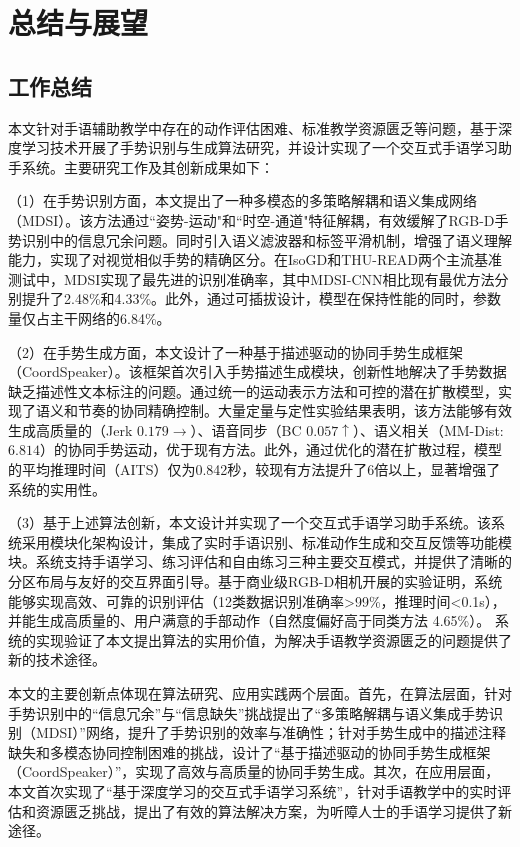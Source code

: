
\chapter{总结与展望}
\label{sec:summary}

\section{工作总结}
本文针对手语辅助教学中存在的动作评估困难、标准教学资源匮乏等问题，基于深度学习技术开展了手势识别与生成算法研究，并设计实现了一个交互式手语学习助手系统。主要研究工作及其创新成果如下：

（1）在手势识别方面，本文提出了一种多模态的多策略解耦和语义集成网络（MDSI）。该方法通过``姿势-运动"和``时空-通道"特征解耦，有效缓解了RGB-D手势识别中的信息冗余问题。同时引入语义滤波器和标签平滑机制，增强了语义理解能力，实现了对视觉相似手势的精确区分。在IsoGD和THU-READ两个主流基准测试中，MDSI实现了最先进的识别准确率，其中MDSI-CNN相比现有最优方法分别提升了2.48\%和4.33\%。此外，通过可插拔设计，模型在保持性能的同时，参数量仅占主干网络的6.84\%。

（2）在手势生成方面，本文设计了一种基于描述驱动的协同手势生成框架（CoordSpeaker）。该框架首次引入手势描述生成模块，创新性地解决了手势数据缺乏描述性文本标注的问题。通过统一的运动表示方法和可控的潜在扩散模型，实现了语义和节奏的协同精确控制。大量定量与定性实验结果表明，该方法能够有效生成高质量的（Jerk $0.179\rightarrow$）、语音同步（BC $0.057\uparrow$）、语义相关（MM-Dist: $6.814$）的协同手势运动，优于现有方法。此外，通过优化的潜在扩散过程，模型的平均推理时间（AITS）仅为0.842秒，较现有方法提升了6倍以上，显著增强了系统的实用性。

（3）基于上述算法创新，本文设计并实现了一个交互式手语学习助手系统。该系统采用模块化架构设计，集成了实时手语识别、标准动作生成和交互反馈等功能模块。系统支持手语学习、练习评估和自由练习三种主要交互模式，并提供了清晰的分区布局与友好的交互界面引导。基于商业级RGB-D相机开展的实验证明，系统能够实现高效、可靠的识别评估（12类数据识别准确率\textgreater 99\%，推理时间\textless 0.1s），并能生成高质量的、用户满意的手部动作（自然度偏好高于同类方法 4.65\%）。
系统的实现验证了本文提出算法的实用价值，为解决手语教学资源匮乏的问题提供了新的技术途径。

本文的主要创新点体现在算法研究、应用实践两个层面。首先，在算法层面，针对手势识别中的“信息冗余”与“信息缺失”挑战提出了“多策略解耦与语义集成手势识别（MDSI）”网络，提升了手势识别的效率与准确性；针对手势生成中的描述注释缺失和多模态协同控制困难的挑战，设计了“基于描述驱动的协同手势生成框架（CoordSpeaker）”，实现了高效与高质量的协同手势生成。其次，在应用层面，本文首次实现了“基于深度学习的交互式手语学习系统”，针对手语教学中的实时评估和资源匮乏挑战，提出了有效的算法解决方案，为听障人士的手语学习提供了新途径。

